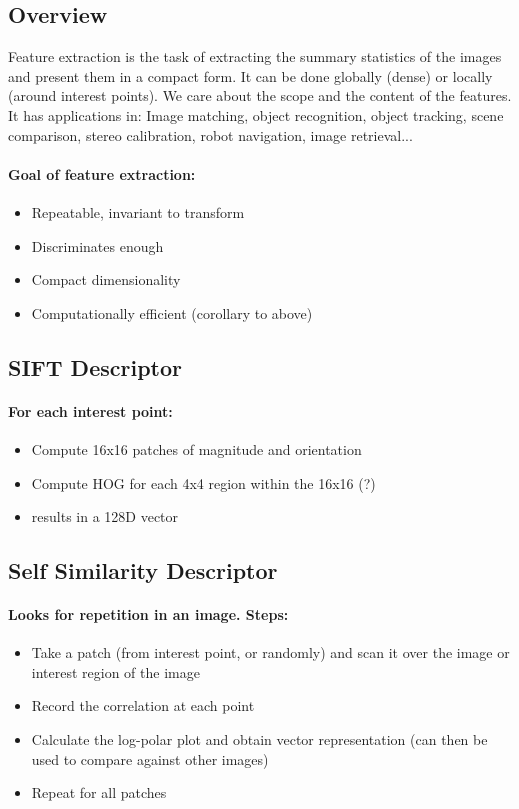 \documentclass[]{article}
\begin{document}
	\subsection{Overview}
	\textnormal{Feature extraction is the task of extracting the summary statistics of the images and present them in a compact form. It can be done globally (dense) or locally (around interest points). We care about the scope and the content of the features. It has applications in: Image matching, object recognition, object tracking, scene comparison, stereo calibration, robot navigation, image retrieval...}
	\paragraph{Goal of feature extraction:}
	\begin{itemize}
		\item Repeatable, invariant to transform
		\item Discriminates enough
		\item Compact dimensionality
		\item Computationally efficient (corollary to above)
	\end{itemize}
	\subsection{SIFT Descriptor}
	\paragraph{For each interest point:}
	\begin{itemize}
		\item Compute 16x16 patches of magnitude and orientation
		\item Compute HOG for each 4x4 region within the 16x16 (?)
		\item results in a 128D vector
		
	\end{itemize}
	\subsection{Self Similarity Descriptor}
	\paragraph{Looks for repetition in an image. Steps:}
	\begin{itemize}
		\item Take a patch (from interest point, or randomly) and scan it over the image or interest region of the image
		\item Record the correlation at each point
		\item Calculate the log-polar plot and obtain vector representation (can then be used to compare against other images)
		\item Repeat for all patches
	\end{itemize}
\end{document}

